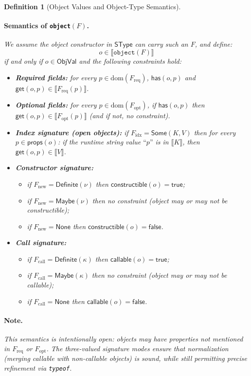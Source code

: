 \documentclass[11pt]{article}
\newtheorem{definition}[theorem]{Definition}
\newcommand{\sem}[1]{\llbracket #1 \rrbracket}
\newcommand{\ObjVal}{\mathsf{ObjVal}}
\newcommand{\SType}{\mathsf{SType}}
\begin{document}
\begin{definition}[Object Values and Object-Type Semantics]
\paragraph{Semantics of \texttt{object}$(F)$.}
We assume the object constructor in $\SType$ can carry such an $F$, and define:
\[
o \in \sem{\texttt{object}(F)}
\]
if and only if $o \in \ObjVal$ and the following constraints hold:
\begin{itemize}
\item \textbf{Required fields:} for every $p \in \mathrm{dom}(F_{\mathrm{req}})$,
$\mathsf{has}(o,p)$ and $\mathsf{get}(o,p) \in \sem{F_{\mathrm{req}}(p)}$.
\item \textbf{Optional fields:} for every $p \in \mathrm{dom}(F_{\mathrm{opt}})$,
if $\mathsf{has}(o,p)$ then $\mathsf{get}(o,p) \in \sem{F_{\mathrm{opt}}(p)}$ (and if not, no constraint).
\item \textbf{Index signature (open objects):} if $F_{\mathrm{idx}}=\mathsf{Some}(K,V)$ then for every $p \in \mathsf{props}(o)$:
if the runtime string value $\text{``}p\text{''}$ is in $\sem{K}$, then $\mathsf{get}(o,p) \in \sem{V}$.
\item \textbf{Constructor signature:}
\begin{itemize}
\item if $F_{\mathrm{new}} = \mathsf{Definite}(\nu)$ then $\mathsf{constructible}(o)=\mathsf{true}$;
\item if $F_{\mathrm{new}} = \mathsf{Maybe}(\nu)$ then no constraint (object may or may not be constructible);
\item if $F_{\mathrm{new}} = \mathsf{None}$ then $\mathsf{constructible}(o)=\mathsf{false}$.
\end{itemize}
\item \textbf{Call signature:}
\begin{itemize}
\item if $F_{\mathrm{call}} = \mathsf{Definite}(\kappa)$ then $\mathsf{callable}(o)=\mathsf{true}$;
\item if $F_{\mathrm{call}} = \mathsf{Maybe}(\kappa)$ then no constraint (object may or may not be callable);
\item if $F_{\mathrm{call}} = \mathsf{None}$ then $\mathsf{callable}(o)=\mathsf{false}$.
\end{itemize}
\end{itemize}
\paragraph{Note.}
This semantics is intentionally \emph{open}: objects may have properties not mentioned in $F_{\mathrm{req}}$ or $F_{\mathrm{opt}}$.
The three-valued signature modes ensure that normalization (merging callable with non-callable objects) is sound, while still permitting precise refinement via \texttt{typeof}.
\end{definition}
\end{document}
